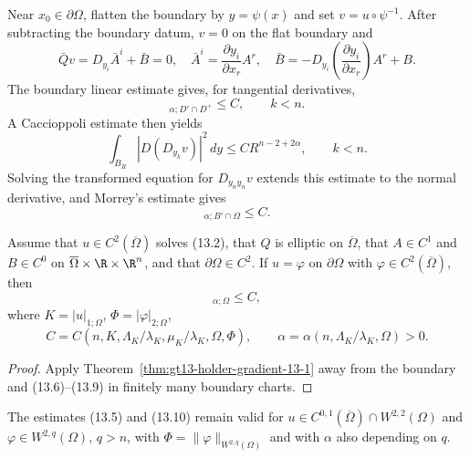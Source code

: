 Near $x_0\in\partial\Omega$, flatten the boundary by $y=\psi(x)$ and set
$v=u\circ\psi^{-1}$.  After subtracting the boundary datum, $v=0$ on the
flat boundary and
\begin{equation}
\bar Qv=D_{y_i}\bar A^i+\bar B=0,
\quad
\bar A^i=\frac{\partial y_i}{\partial x_r}A^r,
\quad
\bar B=-D_{y_i}\!\left(\frac{\partial y_i}{\partial x_r}\right)A^r+B.
\tag{13.6}
\end{equation}
The boundary linear estimate gives, for tangential derivatives,
\begin{equation}
[D_{y_k}v]_{\alpha;D'\cap D^+}\le C,
\qquad k<n.
\tag{13.7}
\end{equation}
A Caccioppoli estimate then yields
\begin{equation}
\int_{B_R}|D(D_{y_k}v)|^2\,dy\le CR^{n-2+2\alpha},
\qquad k<n.
\tag{13.8}
\end{equation}
Solving the transformed equation for $D_{y_ny_n}v$ extends this estimate to
the normal derivative, and Morrey's estimate gives
\begin{equation}
[Du]_{\alpha;B'\cap\Omega}\le C.
\tag{13.9}
\end{equation}

\begin{theorem}
\label{thm:gt13-holder-gradient-13-2}
Assume that $u\in C^2(\overline\Omega)$ solves \textup{(13.2)}, that $Q$ is
elliptic on $\overline\Omega$, that $A\in C^1$ and $B\in C^0$ on
$\overline\Omega\times\R\times\R^n$, and that $\partial\Omega\in C^2$.
If $u=\varphi$ on $\partial\Omega$ with
$\varphi\in C^2(\overline\Omega)$, then
\begin{equation}
[Du]_{\alpha;\Omega}\le C,
\tag{13.10}
\end{equation}
where $K=|u|_{1;\Omega}$, $\Phi=|\varphi|_{2;\Omega}$,
\[
C=C(n,K,\Lambda_K/\lambda_K,\mu_K/\lambda_K,\Omega,\Phi),
\qquad
\alpha=\alpha(n,\Lambda_K/\lambda_K,\Omega)>0.
\]
\end{theorem}
\begin{proof}
\sketch Apply Theorem~\ref{thm:gt13-holder-gradient-13-1} away from the
boundary and \textup{(13.6)--(13.9)} in finitely many boundary charts.
\end{proof}

The estimates \textup{(13.5)} and \textup{(13.10)} remain valid for
$u\in C^{0,1}(\overline\Omega)\cap W^{2,2}(\Omega)$ and
$\varphi\in W^{2,q}(\Omega)$, $q>n$, with
$\Phi=\|\varphi\|_{W^{2,q}(\Omega)}$ and with $\alpha$ also depending on $q$.

